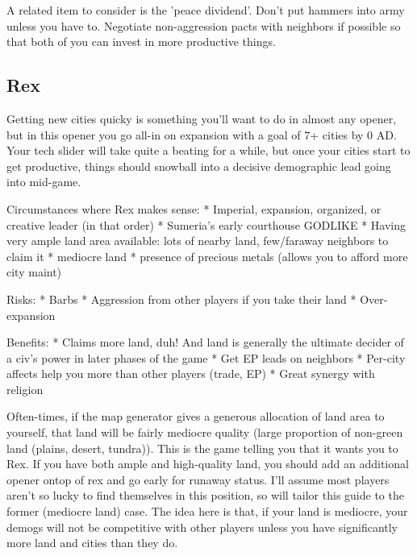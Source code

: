 \documentclass[10pt]{article}
\begin{document}
A related item to consider is the 'peace dividend'. Don't put hammers into army unless you have to. Negotiate
non-aggression pacts with neighbors if possible so that both of you can invest in more productive things.

\subsection*{Rex}

Getting new cities quicky is something you'll want to do in almost any opener, but in this
opener you go all-in on expansion with a goal of 7+ cities by 0 AD. Your tech slider will take
quite a beating for a while, but once your cities start to get productive, things should snowball
into a decisive demographic lead going into mid-game.

Circumstances where Rex makes sense:
* Imperial, expansion, organized, or creative leader (in that order)
* Sumeria's early courthouse GODLIKE
* Having very ample land area available: lots of nearby land, few/faraway neighbors to claim it
* mediocre land
* presence of precious metals (allows you to afford more city maint)

Risks:
* Barbs
* Aggression from other players if you take their land
* Over-expansion

Benefits:
* Claims more land, duh! And land is generally the ultimate decider of a civ's power in later phases of the game
* Get EP leads on neighbors
* Per-city affects help you more than other players (trade, EP)
* Great synergy with religion

Often-times, if the map generator gives a generous allocation of land area to yourself,
that land will be fairly mediocre quality (large proportion of non-green land (plains, desert, tundra)).
This is the game telling you that it wants you to Rex. If you have both ample and high-quality land, you should
add an additional opener ontop of rex and go early for runaway status. I'll assume most players aren't
so lucky to find themselves in this position, so will tailor this guide to the former (mediocre land) case.
The idea here is that, if your land is mediocre, your demogs will not be competitive with other players unless
you have significantly more land and cities than they do.
\end{document}
